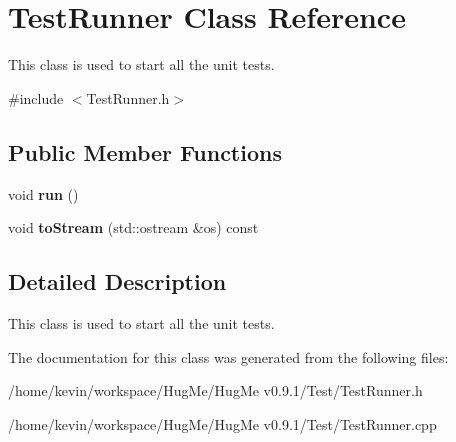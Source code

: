 \hypertarget{classTestRunner}{
\section{TestRunner Class Reference}
\label{classTestRunner}
}


This class is used to start all the unit tests.  




{\ttfamily \#include $<$TestRunner.h$>$}

\subsection*{Public Member Functions}
\begin{DoxyCompactItemize}
\item 
\hypertarget{classTestRunner_a692f0bb1327c4092398b95c27ec6957b}{
void {\bfseries run} ()}
\label{classTestRunner_a692f0bb1327c4092398b95c27ec6957b}

\item 
\hypertarget{classTestRunner_a5d3932d4614f12c9fca2870597b90e1d}{
void {\bfseries toStream} (std::ostream \&os) const }
\label{classTestRunner_a5d3932d4614f12c9fca2870597b90e1d}

\end{DoxyCompactItemize}


\subsection{Detailed Description}
This class is used to start all the unit tests. 

The documentation for this class was generated from the following files:\begin{DoxyCompactItemize}
\item 
/home/kevin/workspace/HugMe/HugMe v0.9.1/Test/TestRunner.h\item 
/home/kevin/workspace/HugMe/HugMe v0.9.1/Test/TestRunner.cpp\end{DoxyCompactItemize}
